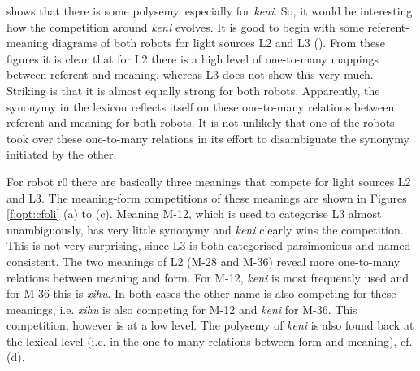  shows that there is some polysemy, especially for {\it keni}. So, it would be interesting how the competition around {\it keni} evolves. It is good to begin with some referent-meaning diagrams of both robots for light sources L2 and L3 (). From these figures it is clear that for L2 there is a high level of one-to-many mappings between referent and meaning, whereas L3 does not show this very much. Striking is that it is almost equally strong for both robots. Apparently, the synonymy in the lexicon reflects itself on these one-to-many relations between referent and meaning for both robots. It is not unlikely that one of the robots took over these one-to-many relations in its effort to disambiguate the synonymy initiated by the other. 

For robot r0 there are basically three meanings that compete for light sources L2 and L3. The meaning-form competitions of these meanings are shown in Figures \ref{f:opt:cfoli} (a) to (c). Meaning M-12, which is used to categorise L3 almost unambiguously, has very little synonymy and {\it keni} clearly wins the competition. This is not very surprising, since L3 is both categorised  parsimonious and named consistent. The two meanings of L2 (M-28 and M-36) reveal more one-to-many relations between meaning and form. For M-12, {\it keni} is most frequently used and for M-36 this is {\it xihu}. In both cases the other name is also competing for these meanings, i.e. {\it xihu} is also competing for M-12 and {\it keni} for M-36. This competition, however is at a low level. The polysemy of {\it keni} is also found back at the lexical level (i.e. in the one-to-many relations between form and meaning), cf.  (d). 

